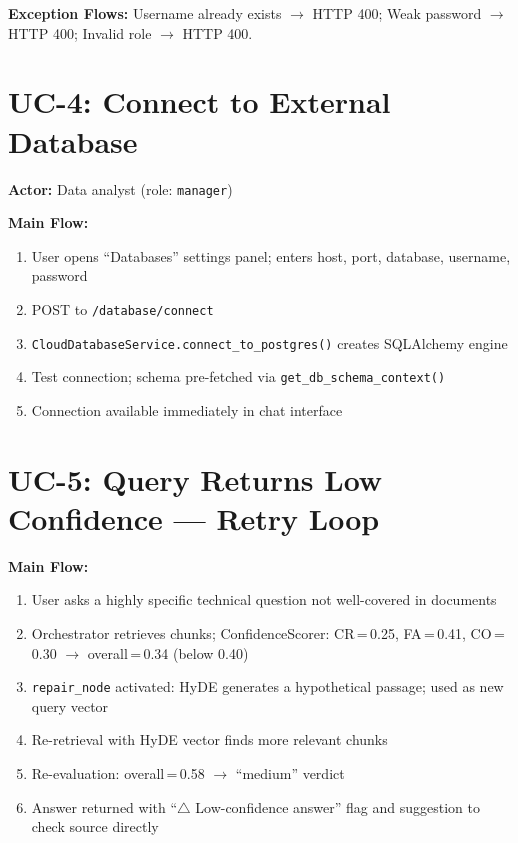 \documentclass[12pt, a4paper, oneside]{report}
\newcommand{\kw}[1]{\texttt{\small #1}}
\begin{document}
\textbf{Exception Flows:} Username already exists $\to$ HTTP 400; Weak password $\to$ HTTP 400; Invalid role $\to$ HTTP 400.

\section{UC-4: Connect to External Database}

\textbf{Actor:} Data analyst (role: \kw{manager})

\textbf{Main Flow:}
\begin{enumerate}
  \item User opens ``Databases'' settings panel; enters host, port, database, username, password
  \item POST to \kw{/database/connect}
  \item \kw{CloudDatabaseService.connect\_to\_postgres()} creates SQLAlchemy engine
  \item Test connection; schema pre-fetched via \kw{get\_db\_schema\_context()}
  \item Connection available immediately in chat interface
\end{enumerate}

\section{UC-5: Query Returns Low Confidence — Retry Loop}

\textbf{Main Flow:}
\begin{enumerate}
  \item User asks a highly specific technical question not well-covered in documents
  \item Orchestrator retrieves chunks; ConfidenceScorer: CR\,=\,0.25, FA\,=\,0.41, CO\,=\,0.30 $\to$ overall\,=\,0.34 (below 0.40)
  \item \kw{repair\_node} activated: HyDE generates a hypothetical passage; used as new query vector
  \item Re-retrieval with HyDE vector finds more relevant chunks
  \item Re-evaluation: overall\,=\,0.58 $\to$ ``medium'' verdict
  \item Answer returned with ``\(\triangle\) Low-confidence answer'' flag and suggestion to check source directly
\end{enumerate}

\end{document}
